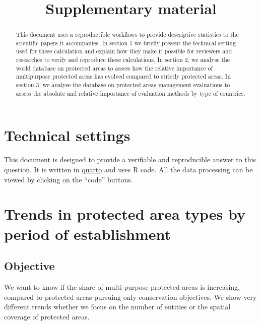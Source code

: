 \documentclass[
  letterpaper,
  DIV=11,
  numbers=noendperiod]{scrartcl}
\title{Supplementary material}
\author{}
\date{}
\begin{document}
\maketitle
\begin{abstract}
This document uses a reproductible workflows to provide descriptive
statistics to the scientific papers it accompanies. In section 1 we
briefly present the technical setting used for these calculation and
explain how they make it possible for reviewers and researches to verify
and reproduce these calculations. In section 2, we analyse the world
database on protected areas to assess how the relative importance of
multipurpose protected areas has evolved compared to strictly protected
areas. In section 3, we analyse the database on protected areas
management evaluations to assess the absolute and relative importance of
evaluation methods by type of countries.
\end{abstract}
\ifdefined\Shaded\renewenvironment{Shaded}{\begin{tcolorbox}[boxrule=0pt, borderline west={3pt}{0pt}{shadecolor}, interior hidden, enhanced, breakable, sharp corners, frame hidden]}{\end{tcolorbox}}\fi

\hypertarget{technical-settings}{%
\section{Technical settings}\label{technical-settings}}

This document is designed to provide a verifiable and reproducible
answer to this question. It is written in
\href{https://quarto.org/}{quarto} and uses R code. All the data
processing can be viewed by clicking on the ``code'' buttons.

\hypertarget{trends-in-protected-area-types-by-period-of-establishment}{%
\section{Trends in protected area types by period of
establishment}\label{trends-in-protected-area-types-by-period-of-establishment}}

\hypertarget{objective}{%
\subsection{Objective}\label{objective}}

We want to know if the share of multi-purpose protected areas is
increasing, compared to protected areas pursuing only conservation
objectives. We show very different trends whether we focus on the number
of entities or the spatial coverage of protected areas.
\end{document}
